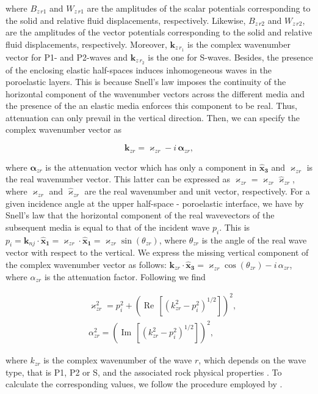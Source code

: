 \documentclass[draft]{agujournal2019}
\renewcommand{\Re}{\operatorname{Re} }
\renewcommand{\Im}{\operatorname{Im} }
\begin{document}
where $B_{z\,r1}$ and $W_{z\,r1}$ are the amplitudes of the scalar potentials corresponding to the solid and relative fluid displacements, respectively. Likewise, $B_{z\,r2}$ and $W_{z\,r2}$, are the amplitudes of the vector potentials corresponding to the solid and relative fluid displacements, respectively. Moreover, $\bm{k}_{z\, r_1}$ is the complex wavenumber vector for P1- and P2-waves and $\bm{k}_{z\, r_2}$ is the one for S-waves. Besides,  the  presence of the enclosing elastic half-spaces induces inhomogeneous waves in the poroelastic layers. This is because Snell's law imposes the continuity of the horizontal component of the wavenumber vectors across the different media and the presence of the an elastic media enforces this component to be real. Thus, attenuation can only prevail in the vertical direction. Then, we can specify the complex wavenumber vector as
\begin{linenomath*}
\begin{equation}\label{Eq.a16}
\bm{k}_{zr}= \bm{\varkappa}_{zr} - i\, \bm{\alpha}_{zr},
\end{equation}
\end{linenomath*}
where $\bm{\alpha}_{zr}$ is the attenuation vector which has only a component in $\bm{\hat{x}_3}$ and $\bm{\varkappa}_{zr}$ is the real wavenumber vector. This latter can be expressed as $\bm{\varkappa}_{zr} = \varkappa_{zr} \bm{\hat{\varkappa}}_{zr}$, where $\varkappa_{zr}$ and $\bm{\hat{\varkappa}}_{zr}$  are the  real wavenumber and unit vector, respectively. For a given incidence angle at the upper half-space - poroelastic interface, we have by Snell's law that the horizontal component of the real wavevectors of the subsequent media is equal to that of the incident wave $p_i$. This is $p_i = \bm{k}_{nj} \cdot \bm{\hat{x}_1} =\bm{\varkappa}_{zr} \cdot \bm{\hat{x}_1} = \varkappa_{zr} \sin(\theta_{zr})$, where $\theta_{zr}$ is the angle of the real wave vector with respect to the vertical. 
We express the missing vertical component of the complex wavenumber vector as follows: $\bm{k}_{zr} \cdot \bm{\hat{x}_3}= \varkappa_{zr}\cos (\theta_{zr}) - i\, \alpha_{zr}$, where $\alpha_{zr}$
is the attenuation factor. Following  we find
\begin{linenomath*}
\begin{equation}\label{Eq.a17}
\begin{split}
& \varkappa_{zr}^2 =p_i^2 + \left(\Re\,[\left( k_{zr}^2 -  p_i^2\right)^{1/2}]\right)^2, \\
& \alpha_{zr}^2 = \left(\Im\,[\left( k_{zr}^2 -  p_i^2\right)^{1/2}]\right)^2, 
\end{split}
\end{equation}
\end{linenomath*}
where $k_{zr}$ is the complex wavenumber of the wave $r$, which depends on the wave type, that is P1, P2 or S, and the associated rock physical properties \cite{Borcherdt1973, Borcherdt1982}. To calculate the corresponding values, we follow the procedure employed by .
\end{document}
